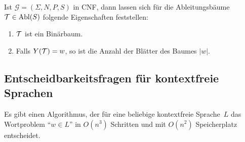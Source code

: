 \begin{Beobachtung}
  Ist $\mathcal{G} = (\Sigma, N, P, S)$ in \ac{CNF}, dann lassen sich für die Ableitungsbäume $\mathcal{T} \in \operatorname{Abl}(S)$ folgende Eigenschaften feststellen:
  \begin{enumerate}
  \item $\mathcal{T}$ ist ein Binärbaum. 
  \item Falls $Y(\mathcal{T}) = w$, so ist die Anzahl der Blätter des Baumes $|w|$.
  \qedhere
  \end{enumerate}
\end{Beobachtung}





\subsection{Entscheidbarkeitsfragen für kontextfreie Sprachen}
\begin{Satz}[name={[Wortproblem für \acs*{CFL} entscheidbar]}]
	Es gibt einen Algorithmus, der für eine beliebige kontextfreie Sprache~$L$ das Wortproblem "`$w\in L$"' in $O(n^3)$ Schritten und mit $O(n^2)$ Speicherplatz entscheidet.
\end{Satz}

